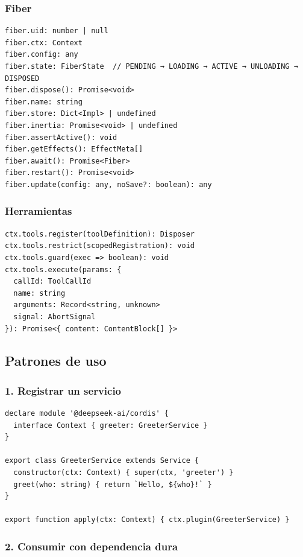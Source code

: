 \documentclass[11pt,a4paper]{article}
\begin{document}
\subsubsection*{Fiber}


\begin{lstlisting}
fiber.uid: number | null
fiber.ctx: Context
fiber.config: any
fiber.state: FiberState  // PENDING → LOADING → ACTIVE → UNLOADING → DISPOSED
fiber.dispose(): Promise<void>
fiber.name: string
fiber.store: Dict<Impl> | undefined
fiber.inertia: Promise<void> | undefined
fiber.assertActive(): void
fiber.getEffects(): EffectMeta[]
fiber.await(): Promise<Fiber>
fiber.restart(): Promise<void>
fiber.update(config: any, noSave?: boolean): any
\end{lstlisting}


\subsubsection*{Herramientas}


\begin{lstlisting}
ctx.tools.register(toolDefinition): Disposer
ctx.tools.restrict(scopedRegistration): void
ctx.tools.guard(exec => boolean): void
ctx.tools.execute(params: {
  callId: ToolCallId
  name: string
  arguments: Record<string, unknown>
  signal: AbortSignal
}): Promise<{ content: ContentBlock[] }>
\end{lstlisting}


\subsection*{Patrones de uso}


\subsubsection*{1. Registrar un servicio}


\begin{lstlisting}
declare module '@deepseek-ai/cordis' {
  interface Context { greeter: GreeterService }
}

export class GreeterService extends Service {
  constructor(ctx: Context) { super(ctx, 'greeter') }
  greet(who: string) { return `Hello, ${who}!` }
}

export function apply(ctx: Context) { ctx.plugin(GreeterService) }
\end{lstlisting}


\subsubsection*{2. Consumir con dependencia dura}
\end{document}
